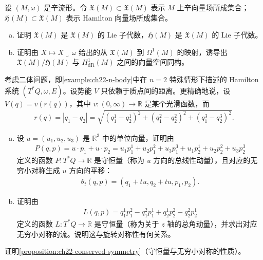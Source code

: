 \documentclass[../../main.tex]{subfiles}
\begin{document}
\begin{exercise}\label{exercise:ch22-p22-16}
设 $(M,\omega)$ 是辛流形。令 $\mathfrak X(M)\subset\mathfrak X(M)$ 表示 $M$ 上辛向量场所成集合；$\mathfrak H(M)\subset\mathfrak X(M)$ 表示 Hamilton 向量场所成集合。
\begin{enumerate}[(a)]
\item 证明 $\mathfrak X(M)$ 是 $\mathfrak X(M)$ 的 Lie 子代数，$\mathfrak H(M)$ 是 $\mathfrak X(M)$ 的 Lie 子代数。
\item 证明由 $X\mapsto X\lrcorner\,\omega$ 给出的从 $\mathfrak X(M)$ 到 $\Omega^1(M)$ 的映射，诱导出 $\mathfrak X(M)/\mathfrak H(M)$ 与 $H^1_{\mathrm{dR}}(M)$ 之间的向量空间同构。
\end{enumerate}
\end{exercise}

\begin{exercise}\label{exercise:ch22-p22-17}
考虑二体问题，即\cref{example:ch22-n-body}中在 $n=2$ 特殊情形下描述的 Hamilton 系统 $(T^*Q,\omega,E)$。设势能 $V$ 只依赖于质点间的距离。更精确地说，设 $V(q)=v(r(q))$，其中 $v:(0,\infty)\to\mathbb R$ 是某个光滑函数，而
\begin{align*}
r(q)=|q_1-q_2|=\sqrt{(q_1^1-q_2^1)^2+(q_1^2-q_2^2)^2+(q_1^3-q_2^3)^2}.
\end{align*}
\begin{enumerate}[(a)]
\item 设 $u=(u_1,u_2,u_3)$ 是 $\mathbb{R}^3$ 中的单位向量，证明由
\begin{align*}
P(q,p)=u\cdot p_1+u\cdot p_2
=u_1p_1^1+u_2p_1^2+u_3p_1^3+u_1p_2^1+u_2p_2^2+u_3p_2^3
\end{align*}
定义的函数 $P:T^*Q\to\mathbb R$ 是守恒量（称为 $u$ 方向的总线性动量），且对应的无穷小对称生成 $u$ 方向的平移：
\begin{align*}
\theta_t(q,p)=(q_1+tu,q_2+tu,p_1,p_2).
\end{align*}
\item 证明由
\begin{align*}
L(q,p)=q_1^1p_1^2-q_1^2p_1^1+q_2^1p_2^2-q_2^2p_2^1
\end{align*}
定义的函数 $L:T^*Q\to\mathbb R$ 是守恒量（称为关于 $z$ 轴的总角动量），并求出对应无穷小对称的流。说明这与旋转对称性有何关系。
\end{enumerate}
\end{exercise}

\begin{exercise}\label{exercise:ch22-p22-18}
证明\cref{proposition:ch22-conserved-symmetry}（守恒量与无穷小对称的性质）。
\end{exercise}
\end{document}
